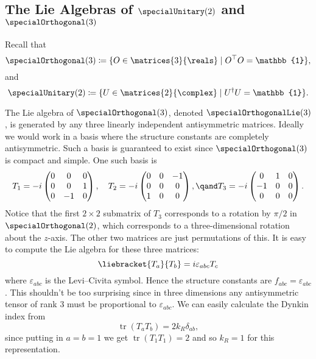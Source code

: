 \documentclass[fleqn]{NotesClass}
\newcommand*{\trans}{\top}
\newcommand*{\hermit}{\dagger}
\newcommand*{\ident}{\mathbb{1}}
\DeclareMathOperator{\tr}{tr}
\begin{document}
    \subsection{The Lie Algebras of \texorpdfstring{\(\specialUnitary(2)\)}{SU(2)} and \texorpdfstring{\(\specialOrthogonal(3)\)}{SO(3)}}
    Recall that
    \begin{equation}
        \specialOrthogonal(3) \coloneqq \{ O \in \matrices{3}{\reals} \mid O^\trans O = \ident \},
    \end{equation}
    and
    \begin{equation}
        \specialUnitary(2) \coloneqq \{ U \in \matrices{2}{\complex} \mid U^\hermit U = \ident \}.
    \end{equation}
    
    The Lie algebra of \(\specialOrthogonal(3)\), denoted \(\specialOrthogonalLie(3)\), is generated by any three linearly independent antisymmetric matrices.
    Ideally we would work in a basis where the structure constants are completely antisymmetric.
    Such a basis is guaranteed to exist since \(\specialOrthogonal(3)\) is compact and simple.
    One such basis is
    \begin{equation}
        T_1 = -i
        \begin{pmatrix}
            0 & 0 & 0\\
            0 & 0 & 1\\
            0 & -1 & 0
        \end{pmatrix}
        , \quad T_2 = -i
        \begin{pmatrix}
            0 & 0 & -1\\
            0 & 0 & 0\\
            1 & 0 & 0
        \end{pmatrix}
        , \qand T_3 = -i
        \begin{pmatrix}
            0 & 1 & 0\\
            -1 & 0 & 0\\
            0 & 0 & 0
        \end{pmatrix}
        .
    \end{equation}
    Notice that the first \(2\times 2\) submatrix of \(T_3\) corresponds to a rotation by \(\pi/2\) in \(\specialOrthogonal(2)\), which corresponds to a three-dimensional rotation about the \(z\)-axis.
    The other two matrices are just permutations of this.
    It is easy to compute the Lie algebra for these three matrices:
    \begin{equation}
        \liebracket{T_a}{T_b} = i\varepsilon_{abc}T_c
    \end{equation}
    where \(\varepsilon_{abc}\) is the Levi--Civita symbol.
    Hence the structure constants are \(f_{abc} = \varepsilon_{abc}\).
    This shouldn't be too surprising since in three dimensions any antisymmetric tensor of rank 3 must be proportional to \(\varepsilon_{abc}\).
    We can easily calculate the Dynkin index from
    \begin{equation}
        \tr(T_aT_b) = 2k_R\delta_{ab},
    \end{equation}
    since putting in \(a = b = 1\) we get \(\tr(T_1T_1) = 2\) and so \(k_R = 1\) for this representation.
    
\end{document}
